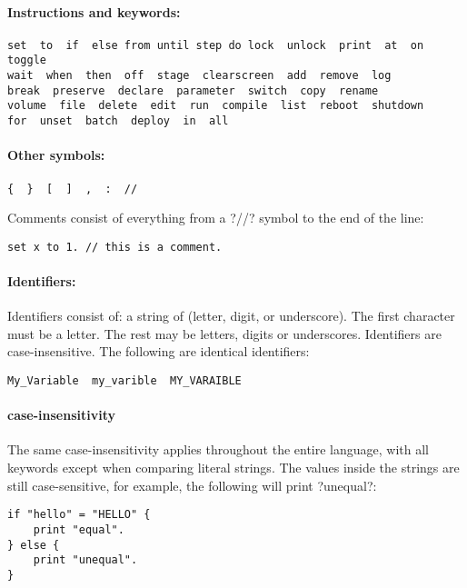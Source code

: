 \paragraph{Instructions and keywords:}

\begin{Verbatim}[frame=single]
set  to  if  else from until step do lock  unlock  print  at  on  toggle
wait  when  then  off  stage  clearscreen  add  remove  log
break  preserve  declare  parameter  switch  copy  rename
volume  file  delete  edit  run  compile  list  reboot  shutdown
for  unset  batch  deploy  in  all
\end{Verbatim}

\paragraph{Other symbols:}

\begin{Verbatim}[frame=single]
{  }  [  ]  ,  :  //
\end{Verbatim}

Comments consist of everything from a ?//? symbol to the end of the line:

\begin{Verbatim}[frame=single]
set x to 1. // this is a comment.
\end{Verbatim}

\paragraph{Identifiers:} Identifiers consist of: a string of (letter, digit, or underscore). The first character must be a letter. The rest may be letters, digits or underscores. Identifiers are case-insensitive. The following are identical identifiers:

\begin{Verbatim}[frame=single]
My_Variable  my_varible  MY_VARAIBLE
\end{Verbatim}

\paragraph{case-insensitivity}
The same case-insensitivity applies throughout the entire language, with all keywords except when comparing literal strings. The values inside the strings are still case-sensitive, for example, the following will print ?unequal?:

\begin{Verbatim}[frame=single]
if "hello" = "HELLO" {
    print "equal".
} else {
    print "unequal".
}
\end{Verbatim}

